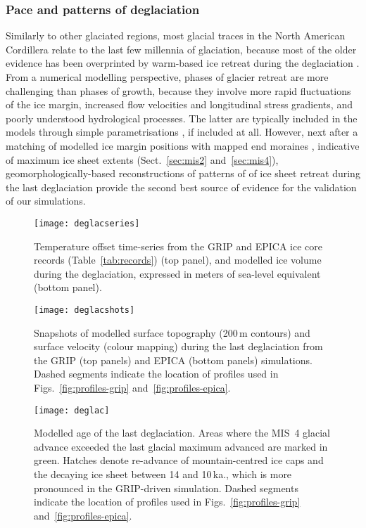 \documentclass[tc]{copernicus}
\begin{document}
\subsubsection{Pace and patterns of deglaciation}

Similarly to other glaciated regions, most glacial traces in the North American
Cordillera relate to the last few millennia of glaciation, because most of the
older evidence has been overprinted by warm-based ice retreat
during the deglaciation \citep{Kleman.1994, Kleman.etal.2010}. From a
numerical modelling perspective, phases of glacier retreat are more challenging
than phases of growth, because they involve more rapid fluctuations of the ice
margin, increased flow velocities and longitudinal stress gradients, and poorly
understood hydrological processes. The latter are typically included in the
models through simple parametrisations \citep[e.g.][]{Clason.etal.2012,
Clason.etal.2014, Bueler.Pelt.2014}, if included at all. However, next after a
matching of modelled ice margin positions with mapped end moraines
\citep{Napieralski.etal.2007}, indicative of maximum ice sheet extents
(Sect.~\ref{sec:mis2} and~\ref{sec:mis4}), geomorphologically-based
reconstructions of patterns of of ice sheet retreat during the last
deglaciation provide the second best source of evidence for the validation of
our simulations.

\begin{figure}
  \texttt{[image: deglacseries]}
  \caption{Temperature offset time-series from the GRIP and EPICA ice core
           records (Table~\ref{tab:records}) (top panel), and modelled ice
           volume during the deglaciation, expressed in meters of sea-level
           equivalent (bottom panel).}
  \label{fig:deglacseries}
\end{figure}

\begin{figure*}
  \texttt{[image: deglacshots]}
  \caption{Snapshots of modelled surface topography (200\,m contours)
           and surface velocity (colour mapping) during the last deglaciation
           from the GRIP (top panels) and EPICA (bottom panels) simulations.
           Dashed segments indicate the location of profiles used in
           Figs.~\ref{fig:profiles-grip} and~\ref{fig:profiles-epica}.}
  \label{fig:deglacshots}
\end{figure*}

\begin{figure*}
  \vspace{-1.5mm}  %
  \texttt{[image: deglac]}
  \caption{Modelled age of the last deglaciation. Areas where the MIS~4 glacial
           advance exceeded the last glacial maximum advanced are marked in
           green. Hatches denote re-advance of mountain-centred ice caps and
           the decaying ice sheet between 14 and 10\,ka., which is more
           pronounced in the GRIP-driven simulation.
           Dashed segments indicate the location of profiles used in
           Figs.~\ref{fig:profiles-grip} and~\ref{fig:profiles-epica}.}
  \label{fig:deglac}
\end{figure*}
\end{document}
